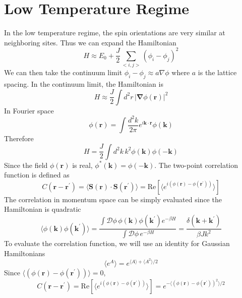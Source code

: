 \documentclass[aps,prb,onecolumn,notitlepage,showpacs,floatfix,superscriptaddress]{revtex4-1}
\begin{document}
\section{Low Temperature Regime}
In the low temperature regime, the spin orientations are very similar at neighboring sites. Thus we can expand the Hamiltonian
\begin{equation}
H \approx E_0 + \dfrac{J}{2} \sum_{<i,j>} \left( \phi_i - \phi_j \right)^2
\end{equation}
We can then take the continuum limit $\phi_i - \phi_j  \approx a \nabla \phi$ where $a$ is the lattice spacing. In the continuum limit, the Hamiltonian is
\begin{equation}
H \approx \dfrac{J}{2} \int d^2r \, \vert {\bm \nabla} \phi({\bm r})\vert^2
\end{equation}
In Fourier space
\begin{equation}
\phi({\bm r}) = \int \dfrac{d^2k}{2\pi} e^{i{\bm k}\cdot{\bm r}} \phi({\bm k})
\end{equation}
Therefore
\begin{equation}
H=\dfrac{J}{2} \int d^2k \, k^2 \phi({\bm k}) \phi(-{\bm k})
\end{equation}
Since the field $\phi(\bm r)$ is real, $\phi^*({\bm k})=\phi(-{\bm k})$. The two-point correlation function is defined as
\begin{equation}
C({\bm r}-{\bm r}^\prime) = \langle {\bm S}({\bm r})\cdot  {\bm S}({\bm r}^\prime)\rangle = \mathrm{Re} \left[ \langle e^{i \left( \phi({\bm r})-\phi({\bm r}^\prime)\right)}\rangle\right]
\end{equation}
The correlation in momentum space can be simply evaluated since the Hamiltonian is quadratic 
\begin{equation}
\langle  \phi({\bm k})  \phi({\bm k}^\prime) \rangle = \dfrac{\int \mathcal{D}\phi \,\phi({\bm k})  \phi({\bm k}^\prime) e^{-\beta H} }{\int \mathcal{D}\phi \, e^{-\beta H} } = \dfrac{\delta({\bm k}+{\bm k}^\prime)}{\beta J k^2}
\end{equation}
To evaluate the correlation function, we will use an identity for Gaussian Hamiltonians
\begin{equation}
\langle e^A \rangle = e^{\langle A \rangle+\langle A^2 \rangle/2}
\end{equation}
Since $\langle \left( \phi({\bm r})-\phi({\bm r}^\prime)\right) \rangle =0$,
\begin{equation}
C({\bm r}-{\bm r}^\prime) = \mathrm{Re} \left[ \langle e^{i \left( \phi({\bm r})-\phi({\bm r}^\prime)\right)}\rangle\right] = e^{-\langle \left( \phi({\bm r})-\phi({\bm r}^\prime)\right)^2 \rangle/2}
\end{equation}
\end{document}
